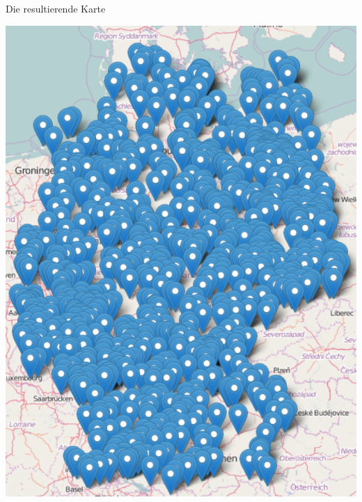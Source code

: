 \documentclass[ignorenonframetext,]{beamer}
\begin{document}
\begin{frame}{Die resultierende Karte}

\includegraphics{figure/Germany_Campsites.PNG}

\end{frame}
\end{document}
